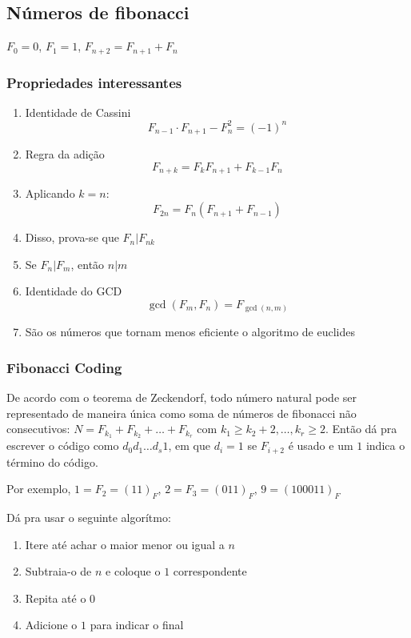 \subsection{Números de fibonacci}

$F_0 = 0$, $F_1 = 1$, $F_{n+2} = F_{n+1} + F_n$

\subsubsection{Propriedades interessantes}

\begin{enumerate}
    \item Identidade de Cassini
    $$F_{n-1} \cdot F_{n+1} - F_n^2 = (-1)^n$$
    \item Regra da adição
    $$F_{n+k} = F_k F_{n+1} + F_{k-1} F_n$$
    \item Aplicando $k=n$:
    $$F_{2n} = F_n(F_{n+1} + F_{n-1})$$
    \item Disso, prova-se que $F_n | F_{nk}$
    \item Se $F_n | F_m$, então $n | m$
    \item Identidade do GCD
    $$ \gcd(F_m, F_n) = F_{\gcd(n, m)}$$
    \item São os números que tornam menos eficiente o algoritmo de euclides
\end{enumerate}

\subsubsection{Fibonacci Coding}

De acordo com o teorema de Zeckendorf, todo número natural pode ser representado de maneira única como soma de números de fibonacci não consecutivos: $N = F_{k_1} + F_{k_2} + \dots + F_{k_r}$ com $k_1 \geq k_2 + 2, \dots , k_r \geq 2$. Então dá pra escrever o código como $d_0 d_1 \dots d_s 1$, em que $d_i=1$ se $F_{i+2}$ é usado e um $1$ indica o término do código.

Por exemplo, $1 = F_2 = (11)_F$, $2 = F_3 = (011)_F$, $9 = (100011)_F$

Dá pra usar o seguinte algorítmo: 

\begin{enumerate}
    \item Itere até achar o maior menor ou igual a $n$
    \item Subtraia-o de $n$ e coloque o $1$ correspondente
    \item Repita até o $0$
    \item Adicione o $1$ para indicar o final
\end{enumerate}

